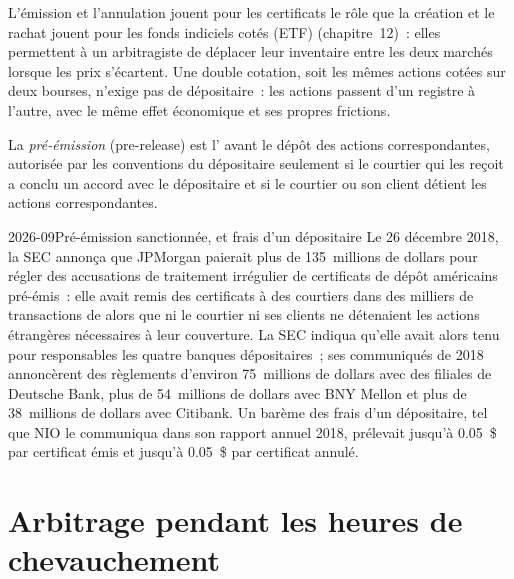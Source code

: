 L'émission et l'annulation jouent pour les certificats le rôle que la création et le rachat jouent pour les fonds indiciels cotés (ETF) (chapitre~12)~: elles permettent à un arbitragiste de
déplacer leur inventaire entre les deux marchés lorsque les prix s'écartent. Une double cotation, soit les mêmes actions cotées sur deux bourses, n'exige pas de dépositaire~: les
actions passent d'un registre à l'autre, avec le même effet économique et ses propres frictions.

\begin{definition}\label{def:hf:depositary-receipts-and-dual-listings:prerelease}
La \emph{pré-émission} (pre-release) est l' avant le dépôt des actions correspondantes, autorisée par les
conventions du dépositaire seulement si le courtier qui les reçoit a conclu un accord avec le dépositaire et si le courtier ou son client détient les
actions correspondantes.
\end{definition}

\begin{dated}{2026-09}{Pré-émission sanctionnée, et frais d'un dépositaire}\label{dat:hf:depositary-receipts-and-dual-listings:prerelease}
Le 26 décembre 2018, la SEC annonça que JPMorgan paierait plus de 135~millions de dollars pour régler des accusations de traitement irrégulier de
certificats de dépôt américains pré-émis~: elle avait remis des certificats à des courtiers dans des milliers de transactions de  alors que ni le courtier ni ses clients
ne détenaient les actions étrangères nécessaires à leur couverture. La SEC indiqua qu'elle avait alors tenu pour responsables les quatre banques dépositaires~; ses communiqués de 2018 annoncèrent
des règlements d'environ 75~millions de dollars avec des filiales de Deutsche Bank, plus de 54~millions de dollars avec BNY Mellon et plus de 38~millions de dollars avec Citibank. Un
barème des frais d'un dépositaire, tel que NIO le communiqua dans son rapport annuel 2018, prélevait jusqu'à 0.05~\$ par certificat émis et jusqu'à 0.05~\$ par
certificat annulé.
\end{dated}

\section{Arbitrage pendant les heures de chevauchement}

